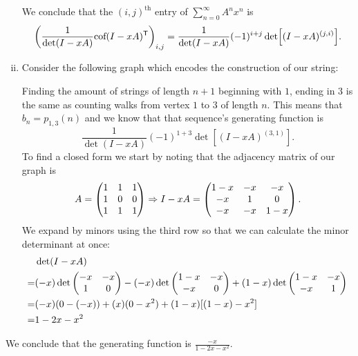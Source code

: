\documentclass[12pt]{memoir}
\begin{document}
\begin{ptcbr}
\begin{enumerate}[i)]
        We conclude that the $(i,j)^{\text{th}}$ entry of $\sum_{n=0}^\infty A^nx^n$ is 
        $$\left(\frac{1}{\det(I-xA)}\text{cof}(I-xA)^{\mathsf{T}}\right)_{i,j}=\frac{1}{\det(I-xA)}(-1)^{i+j}\det[(I-xA)^{(j,i)}].$$
        \item Consider the following graph which encodes the construction of our string:
        \begin{center}
        \end{center}
        Finding the amount of strings of length $n+1$ beginning with $1$, ending in $3$ is the same as counting walks from vertex $1$ to $3$ of length $n$. This means that $b_n=p_{1,3}(n)$ and we know that that sequence's generating function is 
        $$\frac{1}{\det(I-xA)}(-1)^{1+3}\det[(I-xA)^{(3,1)}].$$
        To find a closed form we start by noting that the adjacency matrix of our graph is 
        $$A=\begin{pmatrix} 1 & 1 & 1 \\ 1 & 0 & 0 \\ 1 & 1 & 1 \end{pmatrix}\Rightarrow I-xA=\begin{pmatrix} 1-x & -x & -x \\ -x & 1 & 0 \\ -x & -x & 1-x \end{pmatrix}.$$
        We expand by minors using the third row so that we can calculate the minor determinant at once:
        \begin{align*}
            &\det(I-xA)\\
            =&(-x)\det\begin{pmatrix} -x & -x \\ 1 & 0 \end{pmatrix}-(-x)\det\begin{pmatrix} 1-x & -x \\ -x & 0 \end{pmatrix}+(1-x)\det\begin{pmatrix} 1-x & -x \\ -x & 1 \end{pmatrix}\\
            =&(-x)(0-(-x))+(x)(0-x^2)+(1-x)[(1-x)-x^2]\\
            =&1-2x-x^2
        \end{align*}
    \end{enumerate}
    We conclude that the generating function is $\frac{-x}{1-2x-x^2}$.
    \end{ptcbr}
\end{document}
